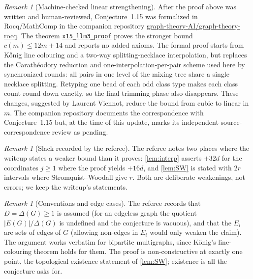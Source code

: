 \documentclass[11pt,a4paper]{article}
\theoremstyle{plain}
\theoremstyle{definition}
\theoremstyle{remark}
\newtheorem{remark}[theorem]{Remark}
\begin{document}
\begin{remark}[Machine-checked linear strengthening]\label{rem:rocq}
After the proof above was written and human-reviewed, Conjecture~1.15 was formalized in Rocq/MathComp in the companion repository \href{https://github.com/graph-theory-AI/graph-theory-rocq}{graph-theory-AI/graph-theory-rocq}. The theorem \href{https://github.com/graph-theory-AI/graph-theory-rocq/blob/main/packing-theory/theories/foundations/fair_matching.v}{\texttt{x15\_llm3\_proof}} proves the stronger bound $c(m)\le12m+14$ and reports no added axioms. The formal proof starts from Kőnig line colouring and a two-way splitting-necklace interpolation, but replaces the Carathéodory reduction and one-interpolation-per-pair scheme used here by synchronized rounds: all pairs in one level of the mixing tree share a single necklace splitting. Retyping one bead of each odd class type makes each class count round down exactly, so the final trimming phase also disappears. These changes, suggested by Laurent Viennot, reduce the bound from cubic to linear in $m$. The companion repository documents the correspondence with Conjecture~1.15 but, at the time of this update, marks its independent source-correspondence review as pending.
\end{remark}

\begin{remark}[Slack recorded by the referee]\label{rem:slack}
The referee notes two places where the writeup states a weaker bound than it proves: \cref{lem:interp} asserts $+32d$ for the coordinates $j\ge1$ where the proof yields $+16d$, and \cref{lem:SW} is stated with $2r$ intervals where Stromquist--Woodall give $r$. Both are deliberate weakenings, not errors; we keep the writeup's statements.
\end{remark}

\begin{remark}[Conventions and edge cases]\label{rem:edgecases}
The referee records that $D=\Delta(G)\ge1$ is assumed (for an edgeless graph the quotient $|E(G)|/\Delta(G)$ is undefined and the conjecture is vacuous), and that the $E_i$ are sets of edges of $G$ (allowing non-edges in $E_i$ would only weaken the claim). The argument works verbatim for bipartite multigraphs, since Kőnig's line-colouring theorem holds for them. The proof is non-constructive at exactly one point, the topological existence statement of \cref{lem:SW}; existence is all the conjecture asks for.
\end{remark}
\end{document}
